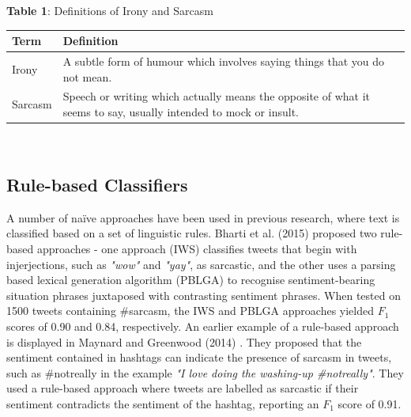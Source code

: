 \documentclass[12pt,a4paper]{article}
\begin{document}
\begin{center}
	\textbf{Table 1}: Definitions of Irony and Sarcasm\vspace{-5pt}
\end{center}
\begin{center}
	\begin{tabular}{p{1.5cm}p{13.2cm}}
		\hline
		\textbf{Term} & \textbf{Definition}\\
		\hline\hline
		Irony & A subtle form of humour which involves saying things that you do not mean. \footnotemark[1]\\
		\hline
		Sarcasm & Speech or writing which actually means the opposite of what it seems to say, usually intended to mock or insult. \footnotemark[2]\\
		\hline
	\end{tabular}\\
\end{center}\vspace{-10pt}

\subsection{Rule-based Classifiers}\vspace{-10pt}
\noindent A number of na\"{i}ve approaches have been used in previous research, where text is classified based on a set of linguistic rules. Bharti et al. (2015) \cite{bharti2015parsing} proposed two rule-based approaches - one approach (IWS) classifies tweets that begin with injerjections, such as \textit{"wow"} and \textit{"yay"}, as sarcastic, and the other uses a parsing based lexical generation algorithm (PBLGA) to recognise sentiment-bearing situation phrases juxtaposed with contrasting sentiment phrases. When tested on 1500 tweets containing \#sarcasm, the IWS and PBLGA approaches yielded $F_1$ scores of 0.90 and 0.84, respectively. An earlier example of a rule-based approach is displayed in Maynard and Greenwood (2014) \cite{maynard2014cares}. They proposed that the sentiment contained in hashtags can indicate the presence of sarcasm in tweets, such as \#notreally in the example \textit{"I love doing the washing-up \#notreally"}. They used a rule-based approach where tweets are labelled as sarcastic if their sentiment contradicts the sentiment of the hashtag, reporting an $F_{1}$ score of 0.91. 
\end{document}
